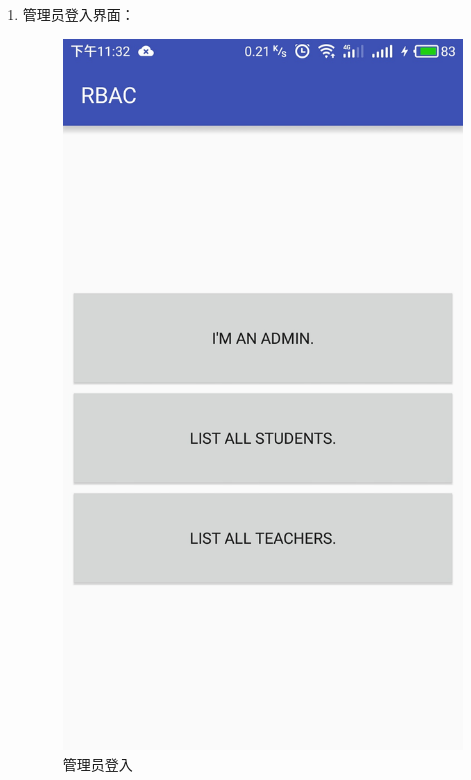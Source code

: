 \begin{itemize}
\begin{enumerate}
\begin{itemize}
\begin{enumerate}
				\item 管理员登入界面：
				\begin{figure}[H]
					\centering
					\includegraphics[height=0.39\textheight]{snapshot/14}
					\caption{管理员登入}
					\label{fig:14}
				\end{figure}
			

\end{enumerate}
\end{itemize}
\end{enumerate}
\end{itemize}
